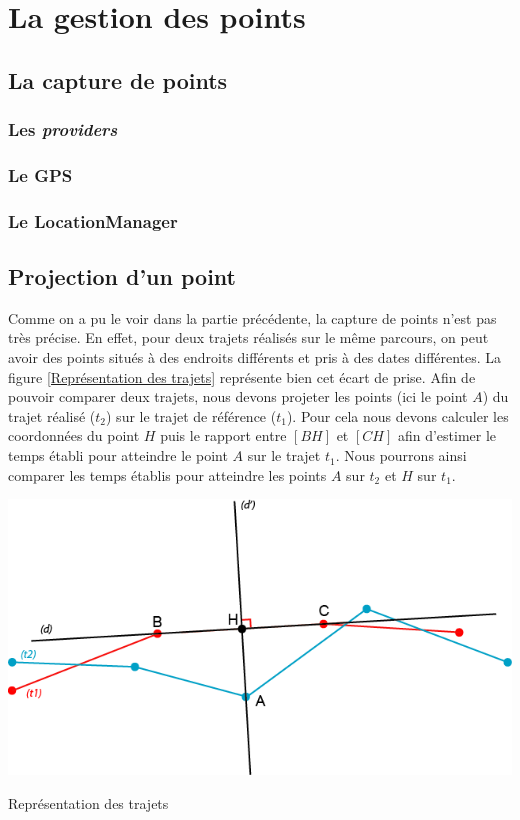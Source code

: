 \chapter{La gestion des points}

\section{La capture de points}
\subsection{Les \textit{providers}}
\subsection{Le GPS}
\subsection{Le LocationManager}

\section{Projection d'un point}
Comme on a pu le voir dans la partie précédente, la capture de points n'est pas très précise. En effet, pour deux trajets réalisés sur le même parcours, on peut avoir des points situés à des endroits différents et pris à des dates différentes. La figure \ref{Représentation des trajets} représente bien cet écart de prise. Afin de pouvoir comparer deux trajets, nous devons projeter les points (ici le point $A$) du trajet réalisé ($t_2$) sur le trajet de référence ($t_1$). Pour cela nous devons calculer les coordonnées du point $H$ puis le rapport entre $[BH]$ et $[CH]$ afin d'estimer le temps établi pour atteindre le point $A$ sur le trajet $t_1$. Nous pourrons ainsi comparer les temps établis pour atteindre les points $A$ sur $t_2$ et $H$ sur $t_1$.

\begin{img}  
	\includegraphics[scale=1]{img/Trajet.png}
	\caption{Représentation des trajets}
	\label{Représentation des trajets}
\end{img}

